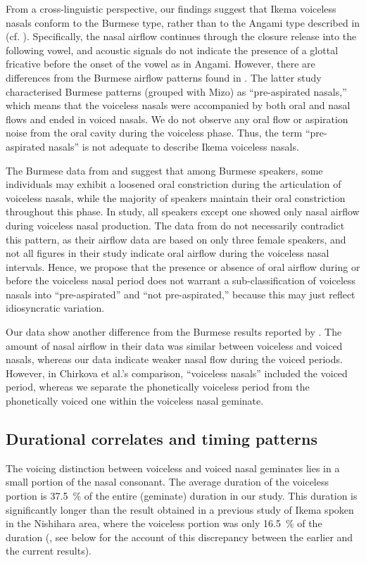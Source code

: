 \documentclass[output=paper]{langscibook}
\begin{document}
From a cross-linguistic perspective, our findings suggest that Ikema voiceless nasals conform to the Burmese type, rather than to the Angami type described in \citet{BhaskararaoLadefoged1991} (cf. ). Specifically, the nasal airflow continues through the closure release into the following vowel, and acoustic signals do not indicate the presence of a glottal fricative before the onset of the vowel as in Angami. However, there are differences from the Burmese airflow patterns found in \citet{ChirkovaEtAl2019}. The latter study characterised Burmese patterns (grouped with Mizo) as “pre-aspirated nasals,” which means that the voiceless nasals were accompanied by both oral and nasal flows and ended in voiced nasals. We do not observe any oral flow or aspiration noise from the oral cavity during the voiceless phase. Thus, the term “pre-aspirated nasals” is not adequate to describe Ikema voiceless nasals.

The Burmese data from \citet{BhaskararaoLadefoged1991} and \citet{ChirkovaEtAl2019} suggest that among Burmese speakers, some individuals may exhibit a loosened oral constriction during the articulation of voiceless nasals, while the majority of speakers maintain their oral constriction throughout this phase. In  study, all speakers except one showed only nasal airflow during voiceless nasal production. The data from \citet{ChirkovaEtAl2019} do not necessarily contradict this pattern, as their airflow data are based on only three female speakers, and not all figures in their study indicate oral airflow during the voiceless nasal intervals. Hence, we propose that the presence or absence of oral airflow during or before the voiceless nasal period does not warrant a sub-classification of voiceless nasals into “pre-aspirated” and “not pre-aspirated,” because this may just reflect idiosyncratic variation.

Our data show another difference from the Burmese results reported by \citet{ChirkovaEtAl2019}. The amount of nasal airflow in their data was similar between voiceless and voiced nasals, whereas our data indicate weaker nasal flow during the voiced periods. However, in Chirkova et al.’s comparison, “voiceless nasals” included the voiced period, whereas we separate the phonetically voiceless period from the phonetically voiced one within the voiceless nasal geminate. 

\subsection{Durational correlates and timing patterns}
\label{sec:shinohara:5.2}
The voicing distinction between voiceless and voiced nasal geminates lies in a small portion of the nasal consonant. The average duration of the voiceless portion is 37.5~\% of the entire (geminate) duration in our study. This duration is significantly longer than the result obtained in a previous study of Ikema spoken in the Nishihara area, where the voiceless portion was only 16.5~\% of the duration (\citealt{ShinoharaFujimoto2018}, see below for the account of this discrepancy between the earlier and the current results). 
\end{document}
